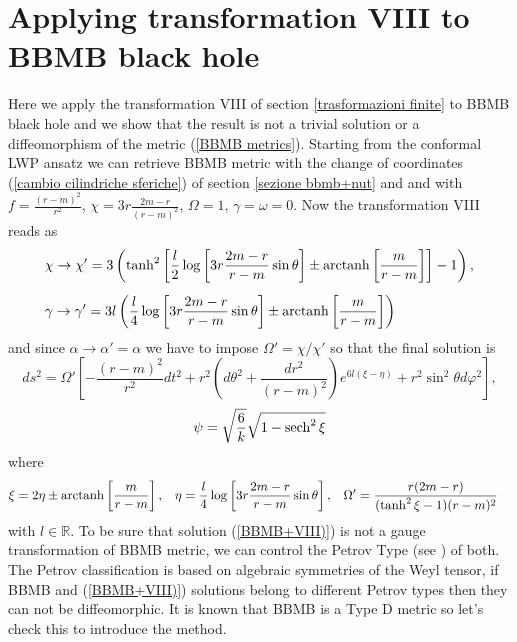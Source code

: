 \section{Applying transformation VIII to BBMB black hole} \label{Capitolo bbmb + VIII} 
Here we apply the transformation VIII of section \ref{trasformazioni finite} to BBMB black hole and we show that the result is not a trivial solution or a diffeomorphism of the metric (\ref{BBMB metrics}). 
Starting from the conformal LWP ansatz we can retrieve BBMB metric with the change of coordinates (\ref{cambio cilindriche sferiche}) of section \ref{sezione bbmb+nut} and and with $f  = \frac{(r-m)^2}{r^2}$, $\chi = 3r\frac{2m-r}{(r-m)^2}$, $\Omega=1$, $\gamma=\omega=0$. Now the transformation VIII reads as 
\begin{align}
        &\chi \rightarrow \chi' = 3\left(\tanh^2\left[\frac{l}{2}\log\left[3r\frac{2m-r}{r-m}\sin\theta\right] \pm \operatorname{arctanh} \left[ \frac{m}{r-m}\right]\right] - 1\right), \notag\\[0.5em]
        &\gamma \rightarrow \gamma' = 3l\left(\frac{l}{4}\log\left[3r\frac{2m-r}{r-m}\sin\theta\right] \pm \operatorname{arctanh} \left[ \frac{m}{r-m}\right] \right)\notag
\end{align}
and since $\alpha\rightarrow\alpha'=\alpha$ we have to impose $\Omega'=\chi/\chi'$ so that the final solution is 
\begin{equation}
    ds^2=\Omega'\left[-\frac{(r-m)^2}{r^2}dt^2+r^2\left(d\theta^2 + \frac{dr^2}{(r-m)^2} \right) e^{6l(\xi-\eta)}+r^2\sin^2\theta d\varphi^2\right],
    \label{BBMB+VIII)}
\end{equation}
\begin{equation}
    \psi=\sqrt{\frac{6}{k}}\sqrt{1-\operatorname{sech}^2\xi} \notag
\end{equation}
where
\begin{align}
  \xi & = 2\eta \pm \operatorname{arctanh} \left[ \frac{m}{r-m}\right], & \eta &= \frac{l}{4}\log\left[3r\frac{2m-r}{r-m}\sin\theta\right], &
  \Omega'& = \frac{r(2m-r)}{( \tanh^2\xi-1)(r-m)^2} \notag
\end{align}
with $l \in \mathbb{R}$. To be sure that solution (\ref{BBMB+VIII)}) is not a gauge transformation of BBMB metric, we can control the Petrov Type (see \citep{stephani_GR}) of both. The Petrov classification is based on algebraic symmetries of the Weyl tensor, if BBMB and (\ref{BBMB+VIII)}) solutions belong to different Petrov types then they can not be diffeomorphic. It is known that BBMB is a Type D metric so let's check this to introduce the method.
